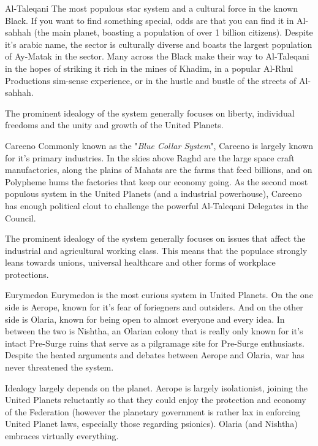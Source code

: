 \begin{multicols}{2}
  \begin{genericsection}{Al-Taleqani}
  The most populous star system and a cultural force in the known Black. If you want to find something special, odds are that you can find it in Al-sahhah (the main planet, boasting a population of over 1 billion citizens). Despite it's arabic name, the sector is culturally diverse and boasts the largest population of Ay-Matak in the sector. Many across the Black make their way to Al-Taleqani in the hopes of striking it rich in the mines of Khadim, in a popular Al-Rhul Productions sim-sense experience, or in the hustle and bustle of the streets of Al-sahhah.
  
  The prominent idealogy of the system generally focuses on liberty, individual freedoms and the unity and growth of the United Planets.
  \end{genericsection}
  
  \begin{genericsection}{Careeno}
  Commonly known as the "\textit{Blue Collar System}", Careeno is largely known for it's primary industries. In the skies above Raghd are the large space craft manufactories, along the plains of Mahats are the farms that feed billions, and on Polypheme hums the factories that keep our economy going. As the second most populous system in the United Planets (and a industrial powerhouse), Careeno has enough political clout to challenge the powerful Al-Taleqani Delegates in the Council.
  
  The prominent idealogy of the system generally focuses on issues that affect the industrial and agricultural working class. This means that the populace strongly leans towards unions, universal healthcare and other forms of workplace protections.
  \end{genericsection}
  
  \begin{genericsection}{Eurymedon}
  Eurymedon is the most curious system in United Planets. On the one side is Aerope, known for it's fear of foriegners and outsiders. And on the other side is Olaria, known for being open to almost everyone and every idea. In between the two is Nishtha, an Olarian colony that is really only known for it's intact Pre-Surge ruins that serve as a pilgramage site for Pre-Surge enthusiasts. Despite the heated arguments and debates between Aerope and Olaria, war has never threatened the system.
  
  Idealogy largely depends on the planet. Aerope is largely isolationist, joining the United Planets reluctantly so that they could enjoy the protection and economy of the Federation (however the planetary government is rather lax in enforcing United Planet laws, especially those regarding psionics). Olaria (and Nishtha) embraces virtually everything.
  \end{genericsection}
  

\end{multicols}
